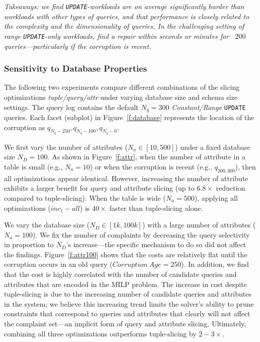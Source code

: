 \smallskip
\textit{
  Takeaways: we find \texttt{UPDATE}-workloads are on average significantly harder than workloads with other types of queries, and that
  performance is closely related to the complexity and the dimensionality of queries. 
  In the challenging setting of range \texttt{UPDATE}-only workloads, \sys find a repair within seconds or minutes for ~$200$ queries---particularly if the corruption is recent. 
}




\subsubsection{Sensitivity to Database Properties}
\label{sec:experiments:dbproperties}

The following two experiments compare different combinations of the slicing optimizations \emph{tuple/query/attr} under varying database size and schema size settings.  
The query log contains the default $N_q = 300$ {\it Constant/Range} \texttt{UPDATE} queries.
Each facet (subplot) in Figure~\ref{f:database} represents the location of the corruption as $q_{N_q-250}, q_{N_q-100}, q_{N_q-0}$.

 
We first vary the number of attributes ($N_a \in [10, 500]$) under a fixed database size $N_D = 100$.
As shown in Figure~\ref{f:attr}, when the number of attribute in a table is small (e.g., $N_a=10$) or when the corruption is recent (e.g., $q_{200, 300}$), then all optimizations appear identical. 
However, increasing the number of attribute exhibits a larger benefit for query and attribute slicing (up to $6.8\times$ reduction compared to tuple-slicing).
When the table is wide ($N_a = 500$), applying all optimizations ($inc_1-all$) is $40\times$ faster than tuple-slicing alone.  


 
We vary the database size ($N_D \in [1k, 100k]$) with a large number of attributes ($N_a = 100$).
We fix the number of complaints by decreasing the query selectivity in proportion to $N_D$'s increase---the specific mechanism to do so did not affect the findings.
Figure~\ref{f:attr100} shows that the costs are relatively flat until the corruption occurs in an old query ($Corruption\ Age = 250$).  
In addition, we find that the cost is highly correlated with the number of candidate queries and attributes that are encoded in the MILP problem.
The increase in cost despite tuple-slicing is due to the increasing number of candidate queries and attributes in the system; 
we believe this increasing trend limits the solver's ability to prune constraints that correspond to queries and attributes that 
clearly will not affect the complaint set---an implicit form of query and attribute slicing.  
Ultimately, combining all three optimizations outperforms tuple-slicing by $2-3\times$.

